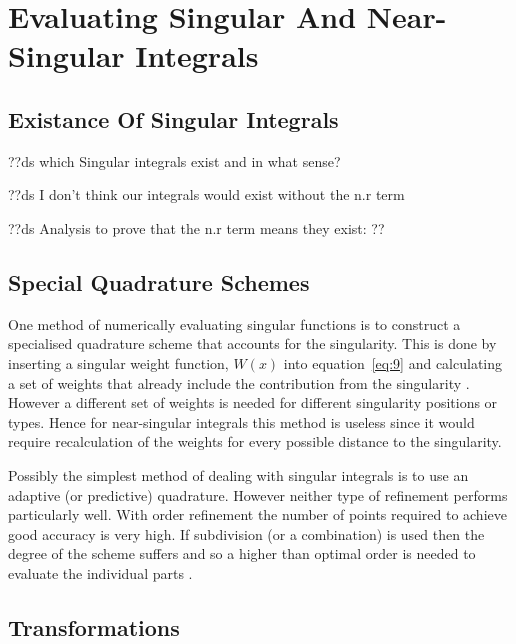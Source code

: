 
\section{Evaluating Singular And Near-Singular Integrals}

\subsection{Existance Of Singular Integrals}
??ds which Singular integrals exist and in what sense?

??ds I don't think our integrals would exist without the n.r term

??ds Analysis to prove that the n.r term means they exist: ??


\subsection{Special Quadrature Schemes}

One method of numerically evaluating singular functions is to construct a specialised quadrature scheme that accounts for the singularity. This is done by inserting a singular weight function, $W(x)$ into equation~\cref{eq:9} and calculating a set of weights that already include the contribution from the singularity \cite{Kolm2001}. However a different set of weights is needed for different singularity positions or types. Hence for near-singular integrals this method is useless since it would require recalculation of the weights for every possible distance to the singularity.

Possibly the simplest method of dealing with singular integrals is to use an adaptive (or predictive) quadrature. However neither type of refinement performs particularly well. With order refinement the number of points required to achieve good accuracy is very high. If subdivision (or a combination) is used then the degree of the scheme suffers and so a higher than optimal order is needed to evaluate the individual parts \cite{Telles1987}.

\subsection{Transformations}

